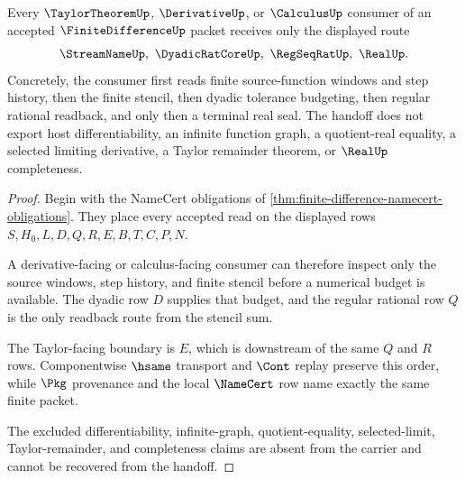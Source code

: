 \begin{theorem}
\label{thm:finite-difference-taylor-handoff}
Every $\TaylorTheoremUp$, $\DerivativeUp$, or $\CalculusUp$ consumer of an accepted $\FiniteDifferenceUp$ packet receives only the displayed route
$$
\StreamNameUp,\ \DyadicRatCoreUp,\ \RegSeqRatUp,\ \RealUp .
$$
Concretely, the consumer first reads finite source-function windows and step history, then the finite stencil, then dyadic tolerance budgeting, then regular rational readback, and only then a terminal real seal. The handoff does not export host differentiability, an infinite function graph, a quotient-real equality, a selected limiting derivative, a Taylor remainder theorem, or $\RealUp$ completeness.
\end{theorem}
\begin{proof}
Begin with the NameCert obligations of \autoref{thm:finite-difference-namecert-obligations}. They place every accepted read on the displayed rows $S,H_0,L,D,Q,R,E,B,T,C,P,N$.

A derivative-facing or calculus-facing consumer can therefore inspect only the source windows, step history, and finite stencil before a numerical budget is available. The dyadic row $D$ supplies that budget, and the regular rational row $Q$ is the only readback route from the stencil sum.

The Taylor-facing boundary is $E$, which is downstream of the same $Q$ and $R$ rows. Componentwise $\hsame$ transport and $\Cont$ replay preserve this order, while $\Pkg$ provenance and the local $\NameCert$ row name exactly the same finite packet.

The excluded differentiability, infinite-graph, quotient-equality, selected-limit, Taylor-remainder, and completeness claims are absent from the carrier and cannot be recovered from the handoff.
\end{proof}

